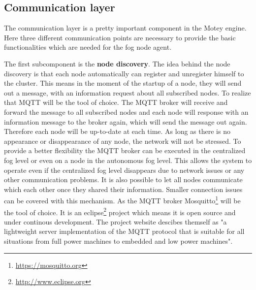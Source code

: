 \subsection{Communication layer}
\label{subsection:CommunicationLayer}
The communication layer is a pretty important component in the Motey engine.
Here three different communication points are necessary to provide the basic functionalities which are needed for the fog node agent.

The first subcomponent is the \textbf{node discovery}.
The idea behind the node discovery is that each node automatically can register and unregister himself to the cluster.
This means in the moment of the startup of a node, they will send out a message, with an information request about all subscribed nodes.
To realize that \ac{MQTT} will be the tool of choice.
The \ac{MQTT} broker will receive and forward the message to all subscribed nodes and each node will response with an information message to the broker again, which will send the message out again.
Therefore each node will be up-to-date at each time.
As long as there is no appearance or disappearance of any node, the network will not be stressed.
To provide a better flexibility the \ac{MQTT} broker can be executed in the centralized fog level or even on a node in the autonomous fog level.
This allows the system to operate even if the centralized fog level disappears due to network issues or any other communication problems.
It is also possible to let all nodes communicate which each other once they shared their information.
Smaller connection issues can be covered with this mechanism.
As the \ac{MQTT} broker Mosquitto\footnote{\url{https://mosquitto.org}} will be the tool of choice.
It is an eclipse\footnote{\url{http://www.eclipse.org}} project which means it is open source and under continous development.
The project website descibes themself as "a lightweight server implementation of the MQTT protocol that is suitable for all situations from full power machines to embedded and low power machines"\autocite{Eclipse:Mosquitto}.

